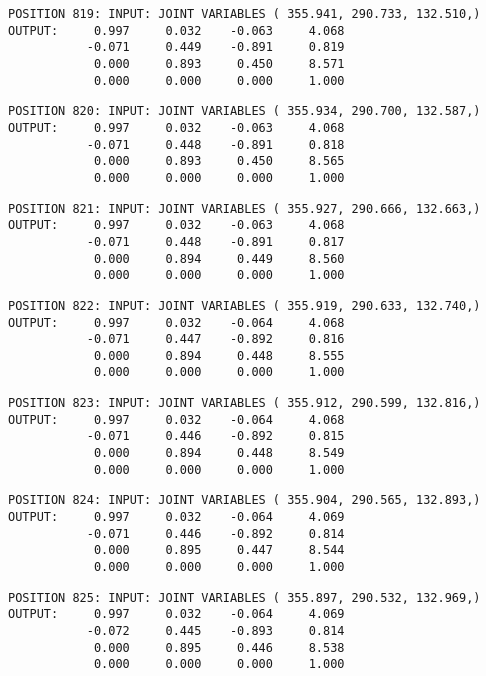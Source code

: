 \begin{verbatim}
POSITION 819: INPUT: JOINT VARIABLES ( 355.941, 290.733, 132.510,)
OUTPUT:     0.997     0.032    -0.063     4.068
           -0.071     0.449    -0.891     0.819
            0.000     0.893     0.450     8.571
            0.000     0.000     0.000     1.000
\end{verbatim} \pagebreak[1]\begin{verbatim}
POSITION 820: INPUT: JOINT VARIABLES ( 355.934, 290.700, 132.587,)
OUTPUT:     0.997     0.032    -0.063     4.068
           -0.071     0.448    -0.891     0.818
            0.000     0.893     0.450     8.565
            0.000     0.000     0.000     1.000
\end{verbatim} \pagebreak[1]\begin{verbatim}
POSITION 821: INPUT: JOINT VARIABLES ( 355.927, 290.666, 132.663,)
OUTPUT:     0.997     0.032    -0.063     4.068
           -0.071     0.448    -0.891     0.817
            0.000     0.894     0.449     8.560
            0.000     0.000     0.000     1.000
\end{verbatim} \pagebreak[1]\begin{verbatim}
POSITION 822: INPUT: JOINT VARIABLES ( 355.919, 290.633, 132.740,)
OUTPUT:     0.997     0.032    -0.064     4.068
           -0.071     0.447    -0.892     0.816
            0.000     0.894     0.448     8.555
            0.000     0.000     0.000     1.000
\end{verbatim} \pagebreak[1]\begin{verbatim}
POSITION 823: INPUT: JOINT VARIABLES ( 355.912, 290.599, 132.816,)
OUTPUT:     0.997     0.032    -0.064     4.068
           -0.071     0.446    -0.892     0.815
            0.000     0.894     0.448     8.549
            0.000     0.000     0.000     1.000
\end{verbatim} \pagebreak[1]\begin{verbatim}
POSITION 824: INPUT: JOINT VARIABLES ( 355.904, 290.565, 132.893,)
OUTPUT:     0.997     0.032    -0.064     4.069
           -0.071     0.446    -0.892     0.814
            0.000     0.895     0.447     8.544
            0.000     0.000     0.000     1.000
\end{verbatim} \pagebreak[1]\begin{verbatim}
POSITION 825: INPUT: JOINT VARIABLES ( 355.897, 290.532, 132.969,)
OUTPUT:     0.997     0.032    -0.064     4.069
           -0.072     0.445    -0.893     0.814
            0.000     0.895     0.446     8.538
            0.000     0.000     0.000     1.000
\end{verbatim} \pagebreak[1]\begin{verbatim}

\end{verbatim}

